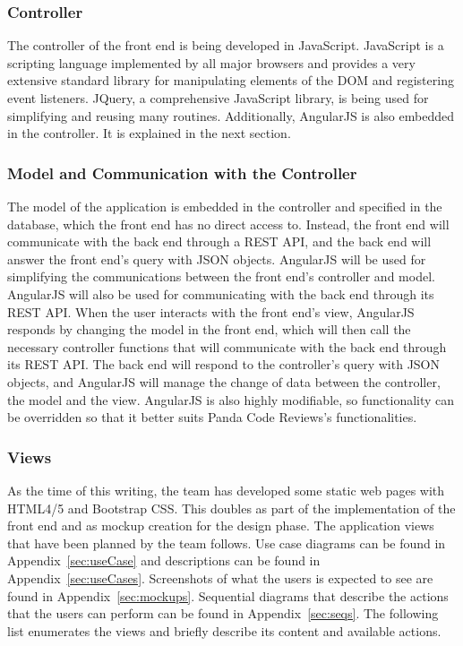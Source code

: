 \subsubsection{Controller}

The controller of the front end is being developed in JavaScript. JavaScript is
a scripting language implemented by all major browsers and provides a very
extensive standard library for manipulating elements of the DOM and registering
event listeners. JQuery\cite{jquery}, a comprehensive JavaScript library, is
being used for simplifying and reusing many routines. Additionally, AngularJS is
also embedded in the controller. It is explained in the next section.

\subsubsection{Model and Communication with the Controller}

The model of the application is embedded in the controller and specified in the
database, which the front end has no direct access to. Instead, the front end
will communicate with the back end through a REST API, and the back end will
answer the front end's query with JSON objects. AngularJS will be used for
simplifying the communications between the front end's controller and model.
AngularJS will also be used for communicating with the back end through its REST
API. When the user interacts with the front end's view, AngularJS responds by
changing the model in the front end, which will then call the necessary
controller functions that will communicate with the back end through its REST
API. The back end will respond to the controller's query with JSON objects, and
AngularJS will manage the change of data between the controller, the model and
the view. AngularJS is also highly modifiable, so functionality can be
overridden so that it better suits Panda Code Reviews's functionalities.

\subsubsection{Views}

As the time of this writing, the team has developed some static web pages with
HTML4/5 and Bootstrap CSS. This doubles as part of the implementation of the
front end and as mockup creation for the design phase. The application views
that have been planned by the team follows. Use case diagrams can be found in
Appendix~\ref{sec:useCase} and descriptions can be found in
Appendix~\ref{sec:useCases}. Screenshots of what the users is expected to see
are found in Appendix~\ref{sec:mockups}. Sequential diagrams that describe the
actions that the users can perform can be found in Appendix~\ref{sec:seqs}. The
following list enumerates the views and briefly describe its content and
available actions.


